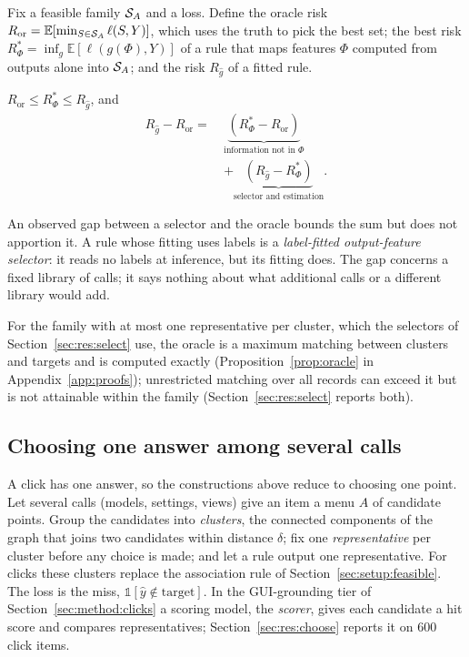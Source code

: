 Fix a feasible family $\mathcal{S}_A$ and a loss. Define the oracle risk $R_{\mathrm{or}}=\mathbb{E}[\min_{S\in\mathcal{S}_A}\ell(S,Y)]$, which uses the truth to pick the best set; the best risk $R^*_\Phi=\inf_g\mathbb{E}[\ell(g(\Phi),Y)]$ of a rule that maps features $\Phi$ computed from outputs alone into $\mathcal{S}_A$; and the risk $R_{\hat g}$ of a fitted rule.

\begin{proposition}\label{prop:order}
$R_{\mathrm{or}}\le R^*_\Phi\le R_{\hat g}$, and
\begin{align*}
R_{\hat g}-R_{\mathrm{or}}=\ &\underbrace{(R^*_\Phi-R_{\mathrm{or}})}_{\text{information not in }\Phi}\\
&+\underbrace{(R_{\hat g}-R^*_\Phi)}_{\text{selector and estimation}}.
\end{align*}
\end{proposition}
An observed gap between a selector and the oracle bounds the sum but does not apportion it. A rule whose fitting uses labels is a \emph{label-fitted output-feature selector}: it reads no labels at inference, but its fitting does. The gap concerns a fixed library of calls; it says nothing about what additional calls or a different library would add.

For the family with at most one representative per cluster, which the selectors of Section~\ref{sec:res:select} use, the oracle is a maximum matching between clusters and targets and is computed exactly (Proposition~\ref{prop:oracle} in Appendix~\ref{app:proofs}); unrestricted matching over all records can exceed it but is not attainable within the family (Section~\ref{sec:res:select} reports both).

\subsection{Choosing one answer among several calls}\label{sec:theory:points}

A click has one answer, so the constructions above reduce to choosing one point. Let several calls (models, settings, views) give an item a menu $A$ of candidate points. Group the candidates into \emph{clusters}, the connected components of the graph that joins two candidates within distance $\delta$; fix one \emph{representative} per cluster before any choice is made; and let a rule output one representative. For clicks these clusters replace the association rule of Section~\ref{sec:setup:feasible}. The loss is the miss, $\mathbb{1}[\hat y\notin\text{target}]$. In the GUI-grounding tier of Section~\ref{sec:method:clicks} a scoring model, the \emph{scorer}, gives each candidate a hit score and compares representatives; Section~\ref{sec:res:choose} reports it on 600 click items.

